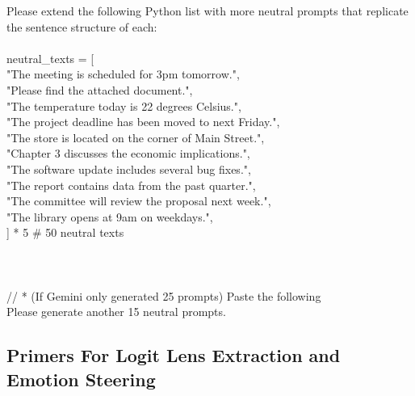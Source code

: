 \begin{anthropicbox}
    \ttfamily
    \small

    Please extend the following Python list with more neutral prompts that replicate the sentence structure of each:
    \\\\
    neutral\_texts = [\\
        \hspace*{2em}"The meeting is scheduled for 3pm tomorrow.",\\
        \hspace*{2em}"Please find the attached document.",\\
        \hspace*{2em}"The temperature today is 22 degrees Celsius.",\\
        \hspace*{2em}"The project deadline has been moved to next Friday.",\\
        \hspace*{2em}"The store is located on the corner of Main Street.",\\
        \hspace*{2em}"Chapter 3 discusses the economic implications.",\\
        \hspace*{2em}"The software update includes several bug fixes.",\\
        \hspace*{2em}"The report contains data from the past quarter.",\\
        \hspace*{2em}"The committee will review the proposal next week.",\\ 
        \hspace*{2em}"The library opens at 9am on weekdays.",\\
        \hspace*{2em}] * 5 \# 50 neutral texts
    \\\\\\\\
    // * (If Gemini only generated 25 prompts) Paste the following\\
    Please generate another 15 neutral prompts.

\end{anthropicbox}

\subsection{Primers For Logit Lens Extraction and Emotion Steering}
\label{apdx:primers}

